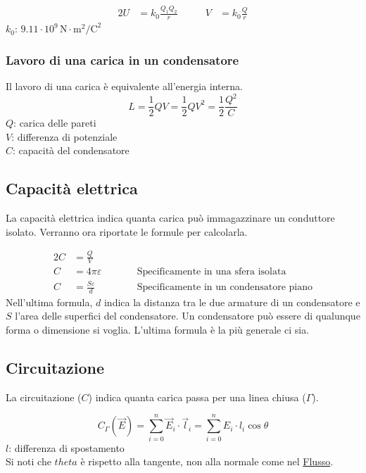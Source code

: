 \begin{alignat*}{2}
U &= k_0\frac{Q_1Q_2}{r} &\qquad V &= k_0\frac{Q}{r}
\end{alignat*}
\hyperref[tab:k0]{$k_0$}: $9.11\cdot10^9\,\text{N}\cdot\text{m}^2\text{/C}^2$

\subsubsection{Lavoro di una carica in un condensatore}
Il lavoro di una carica è equivalente all'energia interna.
\begin{equation*}
L = \frac{1}{2}QV = \frac{1}{2}QV^2 = \frac{1}{2}\frac{Q^2}{C}
\end{equation*}
$Q$: carica delle pareti\\
$V$: differenza di potenziale\\
$C$: capacità del condensatore

\subsection{Capacità elettrica}\label{sub:elettrostatica:capacita}
La capacità elettrica indica quanta carica può immagazzinare un conduttore isolato. Verranno ora 
riportate le formule per calcolarla.

\begin{alignat*}{2}
C &= \frac{Q}{V} &\qquad &\\
C &= 4\pi\varepsilon & &\text{Specificamente in una sfera isolata}\\
C &= \frac{S\varepsilon}{d} & &\text{Specificamente in un condensatore piano}
\end{alignat*}
Nell'ultima formula, $d$ indica la distanza tra le due armature di un condensatore e $S$ l'area 
delle superfici del condensatore. Un condensatore può essere di qualunque forma o dimensione si
voglia. L'ultima formula è la più generale ci sia.

\subsection{Circuitazione}
La circuitazione ($C$) indica quanta carica passa per una linea chiusa ($\Gamma$).

\begin{equation*}
C_\Gamma\left(\vec{E}\right) = \sum\limits_{i=0}^{n}\vec{E}_i\cdot\vec{l}_i = 
\sum\limits_{i=0}^{n} E_i\cdot l_i\cos\theta
\end{equation*}
$l$: differenza di spostamento\\
Si noti che $theta$ è rispetto alla tangente, non alla normale come nel 
\hyperref[subsec:flusso]{Flusso}.
\begin{center}
\end{center}

